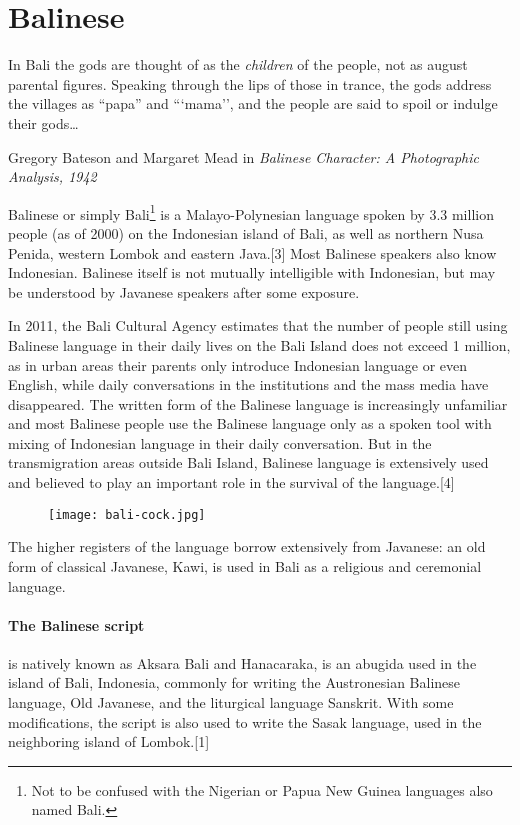 \section{Balinese}

\epigraph{In Bali the gods are thought of as the \textit{children} of the people, not as august parental figures. Speaking through the lips of those in trance, the gods address the villages as ``papa''  and ```mama'', and the people are said to spoil or indulge their gods\ldots}{Gregory Bateson and Margaret Mead in \textit{Balinese Character: A Photographic Analysis, 1942}}
\label{s:balinese}


Balinese or simply Bali\footnote{Not to be confused with the Nigerian or Papua New Guinea languages also named Bali.} is a Malayo-Polynesian language spoken by 3.3 million people (as of 2000) on the Indonesian island of Bali, as well as northern Nusa Penida, western Lombok and eastern Java.[3] Most Balinese speakers also know Indonesian. Balinese itself is not mutually intelligible with Indonesian, but may be understood by Javanese speakers after some exposure.

In 2011, the Bali Cultural Agency estimates that the number of people still using Balinese language in their daily lives on the Bali Island does not exceed 1 million, as in urban areas their parents only introduce Indonesian language or even English, while daily conversations in the institutions and the mass media have disappeared. The written form of the Balinese language is increasingly unfamiliar and most Balinese people use the Balinese language only as a spoken tool with mixing of Indonesian language in their daily conversation. But in the transmigration areas outside Bali Island, Balinese language is extensively used and believed to play an important role in the survival of the language.[4]

\begin{figure}[htbp]
\centering

\texttt{[image: bali-cock.jpg]}
\end{figure}

The higher registers of the language borrow extensively from Javanese: an old form of classical Javanese, Kawi, is used in Bali as a religious and ceremonial language.

\paragraph{The Balinese script} is natively known as Aksara Bali and Hanacaraka, is an abugida used in the island of Bali, Indonesia, commonly for writing the Austronesian Balinese language, Old Javanese, and the liturgical language Sanskrit. With some modifications, the script is also used to write the Sasak language, used in the neighboring island of Lombok.[1] 

